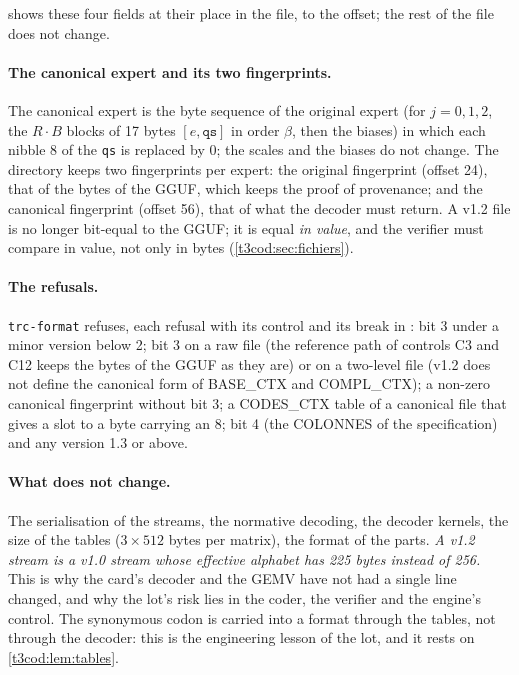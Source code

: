 \begin{figure}[tbp]
\centering
\SchemaCodonFormat
{}
\label{fig:t3-codon-format}
\end{figure}

 shows these four fields at their place in the file, to the offset; the rest of the file does not change.

\paragraph{The canonical expert and its two fingerprints.} The canonical expert is the byte sequence of the original expert (for $j = 0, 1, 2$, the $R \cdot B$ blocks of 17 bytes $[e, \texttt{qs}]$ in order $\beta$, then the biases) in which each nibble 8 of the \texttt{qs} is replaced by 0; the scales and the biases do not change. The directory keeps two fingerprints per expert: the original fingerprint (offset 24), that of the bytes of the GGUF, which keeps the proof of provenance; and the canonical fingerprint (offset 56), that of what the decoder must return. A v1.2 file is no longer bit-equal to the GGUF; it is equal \emph{in value}, and the verifier must compare in value, not only in bytes (\cref{t3cod:sec:fichiers}).

\paragraph{The refusals.} \texttt{trc-format} refuses, each refusal with its control and its break in : bit 3 under a minor version below 2; bit 3 on a raw file (the reference path of controls C3 and C12 keeps the bytes of the GGUF as they are) or on a two-level file (v1.2 does not define the canonical form of BASE\_CTX and COMPL\_CTX); a non-zero canonical fingerprint without bit 3; a CODES\_CTX table of a canonical file that gives a slot to a byte carrying an 8; bit 4 (the COLONNES of the specification) and any version 1.3 or above.

\paragraph{What does not change.} The serialisation of the streams, the normative decoding, the decoder kernels, the size of the tables ($3 \times 512$ bytes per matrix), the format of the parts. \emph{A v1.2 stream is a v1.0 stream whose effective alphabet has 225 bytes instead of 256.} This is why the card's decoder and the GEMV have not had a single line changed, and why the lot's risk lies in the coder, the verifier and the engine's control. The synonymous codon is carried into a format through the tables, not through the decoder: this is the engineering lesson of the lot, and it rests on \cref{t3cod:lem:tables}.

